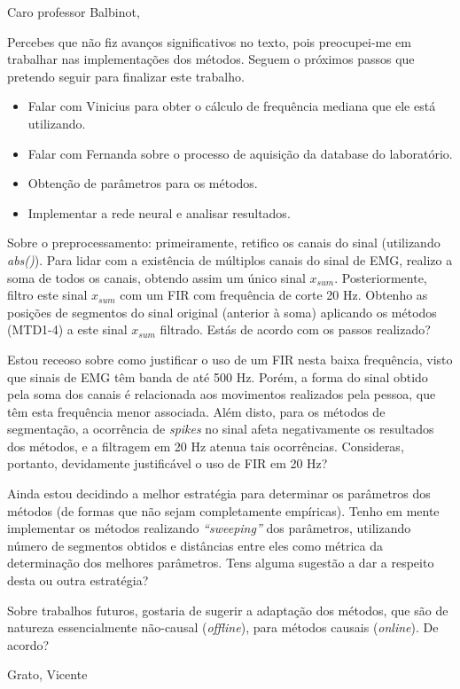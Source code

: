 Caro professor Balbinot,

Percebes que não fiz avanços significativos no texto, pois preocupei-me em trabalhar nas implementações dos métodos. Seguem o próximos passos que pretendo seguir para finalizar este trabalho.
\begin{itemize}
	\item Falar com Vinicius para obter o cálculo de frequência mediana que ele está utilizando.
	\item Falar com Fernanda sobre o processo de aquisição da database do laboratório.
	\item Obtenção de parâmetros para os métodos.
	\item Implementar a rede neural e analisar resultados.
\end{itemize}

Sobre o preprocessamento: primeiramente, retifico os canais do sinal (utilizando \emph{abs()}). Para lidar com a existência de múltiplos canais do sinal de EMG, realizo a soma de todos os canais, obtendo assim um único sinal \emph{$x_{sum}$}. Posteriormente, filtro este sinal \emph{$x_{sum}$} com um FIR com frequência de corte 20 Hz. Obtenho as posições de segmentos do sinal original (anterior à soma) aplicando os métodos (MTD1-4) a este sinal \emph{$x_{sum}$} filtrado. Estás de acordo com os passos realizado?

Estou receoso sobre como justificar o uso de um FIR nesta baixa frequência, visto que sinais de EMG têm banda de até 500 Hz. Porém, a forma do sinal obtido pela soma dos canais é relacionada aos movimentos realizados pela pessoa, que têm esta frequência menor associada. Além disto, para os métodos de segmentação, a ocorrência de \emph{spikes} no sinal afeta negativamente os resultados dos métodos, e a filtragem em 20 Hz atenua tais ocorrências. Consideras, portanto, devidamente justificável o uso de FIR em 20 Hz?

Ainda estou decidindo a melhor estratégia para determinar os parâmetros dos métodos (de formas que não sejam completamente empíricas). Tenho em mente implementar os métodos realizando \emph{``sweeping''} dos parâmetros, utilizando número de segmentos obtidos e distâncias entre eles como métrica da determinação dos melhores parâmetros. Tens alguma sugestão a dar a respeito desta ou outra estratégia?

Sobre trabalhos futuros, gostaria de sugerir a adaptação dos métodos, que são de natureza essencialmente não-causal (\emph{offline}), para métodos causais (\emph{online}). De acordo?

Grato,
Vicente